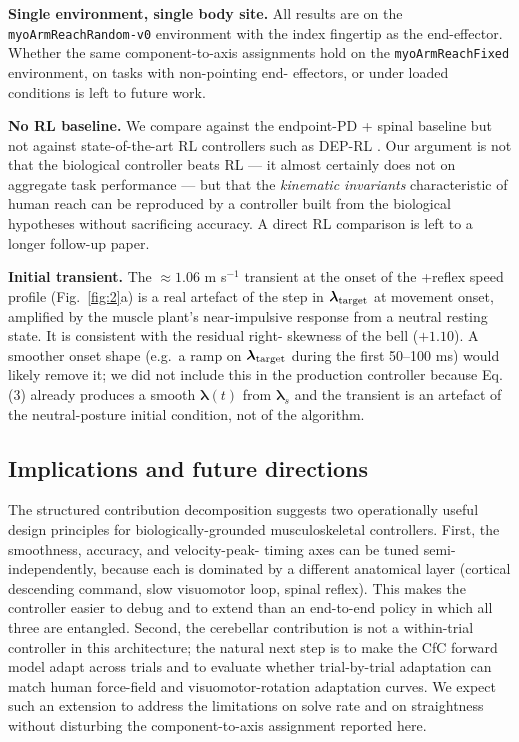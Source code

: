 \documentclass[sn-basic]{sn-jnl}
\begin{document}
\textbf{Single environment, single body site.} All results are on the
\texttt{myoArmReachRandom-v0} environment with the index fingertip as
the end-effector. Whether the same component-to-axis assignments hold on
the \texttt{myoArmReachFixed} environment, on tasks with non-pointing
end- effectors, or under loaded conditions is left to future work.

\textbf{No RL baseline.} We compare against the endpoint-PD + spinal
baseline but not against state-of-the-art RL controllers such as DEP-RL
\citep{schumacher2023}. Our argument is not that the biological
controller beats RL --- it almost certainly does not on aggregate task
performance --- but that the \emph{kinematic invariants} characteristic
of human reach can be reproduced by a controller built from the
biological hypotheses without sacrificing accuracy. A direct RL
comparison is left to a longer follow-up paper.

\textbf{Initial transient.} The \(\approx 1.06\) m s\(^{-1}\) transient
at the onset of the +reflex speed profile (Fig.~\ref{fig:2}a) is a real artefact
of the step in \(\boldsymbol{\lambda}_{\rm target}\) at movement onset,
amplified by the muscle plant's near-impulsive response from a neutral
resting state. It is consistent with the residual right- skewness of the
bell (\(+1.10\)). A smoother onset shape (e.g.~a ramp on
\(\boldsymbol{\lambda}_{\rm target}\) during the first 50--100 ms) would
likely remove it; we did not include this in the production controller
because Eq. (3) already produces a smooth \(\boldsymbol{\lambda}(t)\)
from \(\boldsymbol{\lambda}_{s}\) and the transient is an artefact of
the neutral-posture initial condition, not of the algorithm.

\subsection{Implications and future
directions}

The structured contribution decomposition suggests two operationally
useful design principles for biologically-grounded musculoskeletal
controllers. First, the smoothness, accuracy, and velocity-peak- timing
axes can be tuned semi-independently, because each is dominated by a
different anatomical layer (cortical descending command, slow visuomotor
loop, spinal reflex). This makes the controller easier to debug and to
extend than an end-to-end policy in which all three are entangled.
Second, the cerebellar contribution is not a within-trial controller in
this architecture; the natural next step is to make the CfC forward
model adapt across trials and to evaluate whether trial-by-trial
adaptation can match human force-field and visuomotor-rotation
adaptation curves. We expect such an extension to address the
limitations on solve rate and on straightness without disturbing the
component-to-axis assignment reported here.
\end{document}

